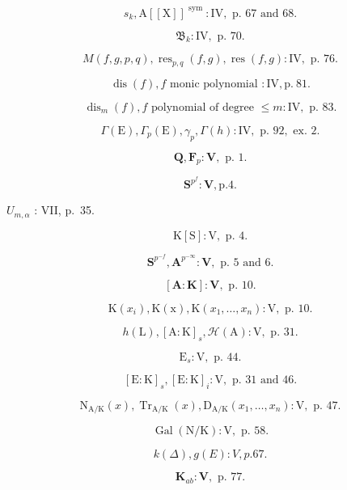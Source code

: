 \[
s _ {k}, \mathrm{A} [ [ \mathrm{X} ] ] ^ {\text { sym }}: \mathrm{IV}, \text { p. } 67 \text { and } 68.
\]

\[
\mathfrak {B} _ {k}: \mathrm{IV}, \text { p. } 70.
\]

\[
M (f, g, p, q), \operatorname{res} _ {p, q} (f, g), \operatorname{res} (f, g): \mathrm{IV}, \text {   p.   } 76.
\]

\[
\operatorname{dis} (f), f \text {   monic   polynomial }: \mathrm{IV}, \mathrm{p.~81}.
\]

\[
\operatorname{dis} _ {m} (f), f \text { polynomial   of   degree } \leqslant m: \mathrm{IV}, \text { p. } 83.
\]

\[
\Gamma (\mathrm{E}), \Gamma_ {p} (\mathrm{E}), \gamma_ {p}, \Gamma (h): \mathrm{IV}, \text { p. } 92, \text { ex. } 2.
\]

\[
\mathbf {Q}, \mathbf {F} _ {p}: \mathbf {V}, \text { p. } 1.
\]

\[
\mathbf {S} ^ {p ^ {f}}: \mathbf {V}, \mathrm{p.} 4.
\]

\(U_{m,\alpha}\) : VII, p.~35.

\[
\mathrm{K} [ \mathrm{S} ]: \mathrm{V}, \text { p. } 4.
\]

\[
\mathbf {S} ^ {p ^ {- f}}, \mathbf {A} ^ {p ^ {- \infty}}: \mathbf {V}, \text { p. } 5 \text { and } 6.
\]

\[
[ \mathbf {A}: \mathbf {K} ]: \mathbf {V}, \text { p. } 10.
\]

\[
\mathrm{K} (x _ {i}), \mathrm{K} (\mathrm{x}), \mathrm{K} (x _ {1}, \dots , x _ {n}): \mathrm{V}, \text { p. } 10.
\]

\[
h (\mathrm{L}), [ \mathrm{A}: \mathrm{K} ] _ {s}, \mathscr {H} (\mathrm{A}): \mathrm{V}, \text { p. } 31.
\]

\[
\mathrm{E} _ {s}: \mathrm{V}, \text { p. } 44.
\]

\[
[ \mathrm{E}: \mathrm{K} ] _ {s}, [ \mathrm{E}: \mathrm{K} ] _ {i}: \mathrm{V}, \text { p. } 31 \text { and } 46.
\]

\[
\mathrm{N} _ {\mathrm{A} / \mathrm{K}} (x), \operatorname{Tr} _ {\mathrm{A} / \mathrm{K}} (x), \mathrm{D} _ {\mathrm{A} / \mathrm{K}} (x _ {1}, \dots , x _ {n}): \mathrm{V}, \text { p. } 47.
\]

\[
\operatorname{Gal} (\mathrm{N} / \mathrm{K}): \mathrm{V}, \text { p. } 58.
\]

\[
k (\Delta), g (E): V, p. 67.
\]

\[
\mathbf {K} _ {ab}: \mathbf {V}, \text { p. } 77.
\]

